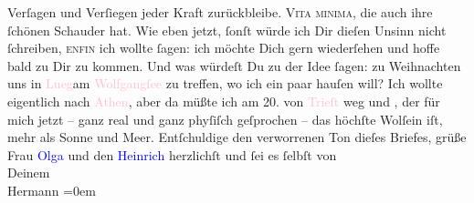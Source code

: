                Verſagen und Verſiegen jeder Kraft zurückbleibe. \textsc{Vita
                  minima}, die auch ihre ſchönen Schauder hat. Wie eben jetzt, ſonſt würde ich
               Dir dieſen Unsinn nicht ſchreiben, \textsc{enfin} ich wollte ſagen:
               ich möchte Dich gern wiederſehen und hoffe bald zu Dir zu kommen. Und was würdeſt Du
               zu der Idee ſagen: zu Weihnachten uns in \textcolor{pink}{Lueg}{}\ledrightnote{\textcolor{pink}{Lueg am Wolfgangsee}}{ }\introOben{}am \textcolor{pink}{Wolfgangſee}{}\ledrightnote{\textcolor{pink}{Wolfgangsee}}\introOben{} zu treffen, wo ich ein paar \label{K_L01474_2v}\label{K_L01474_2h} hauſen will? Ich wollte eigentlich nach \textcolor{pink}{Athen}{}\ledrightnote{\textcolor{pink}{Athen}}, aber da müßte ich am 20. von \textcolor{pink}{Trieſt}{}\ledrightnote{\textcolor{pink}{Triest}} weg und \label{K_L01474_3v}\label{K_L01474_3h}, der für mich jetzt – ganz real und ganz phyſiſch geſprochen –
               das höchſte Wolſein iſt, mehr als Sonne und Meer.\pend
           \pstart
           Entſchuldige den verworrenen Ton dieſes Briefes, grüße Frau \textcolor{blue}{Olga}{}\ledrightnote{\textcolor{blue}{Olga Schnitzler}} und den \textcolor{blue}{Heinrich}{}\ledrightnote{\textcolor{blue}{Heinrich Schnitzler}}
               herzlichſt und ſei es ſelbſt von{\\[\baselineskip]}Deinem{\\[\baselineskip]}\spacefill\mbox{Hermann}\pend
           \leftskip=0em{}\endnumbering{}  
      